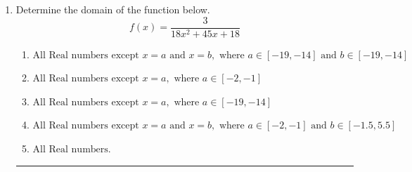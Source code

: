 \documentclass[14pt]{extbook}
\newcommand{\litem}[1]{\item#1\hspace*{-1cm}\rule{\textwidth}{0.4pt}}
\begin{document}
\begin{enumerate}
{\begin{enumerate}[label=\Alph*.]
\end{enumerate} }
\litem{
Determine the domain of the function below.\[ f(x) = \frac{3}{18x^{2} +45 x + 18} \]\begin{enumerate}[label=\Alph*.]
\item \( \text{All Real numbers except } x = a \text{ and } x = b, \text{ where } a \in [-19, -14] \text{ and } b \in [-19, -14] \)
\item \( \text{All Real numbers except } x = a, \text{ where } a \in [-2, -1] \)
\item \( \text{All Real numbers except } x = a, \text{ where } a \in [-19, -14] \)
\item \( \text{All Real numbers except } x = a \text{ and } x = b, \text{ where } a \in [-2, -1] \text{ and } b \in [-1.5, 5.5] \)
\item \( \text{All Real numbers.} \)


\end{enumerate}}
\end{enumerate}
\end{document}
